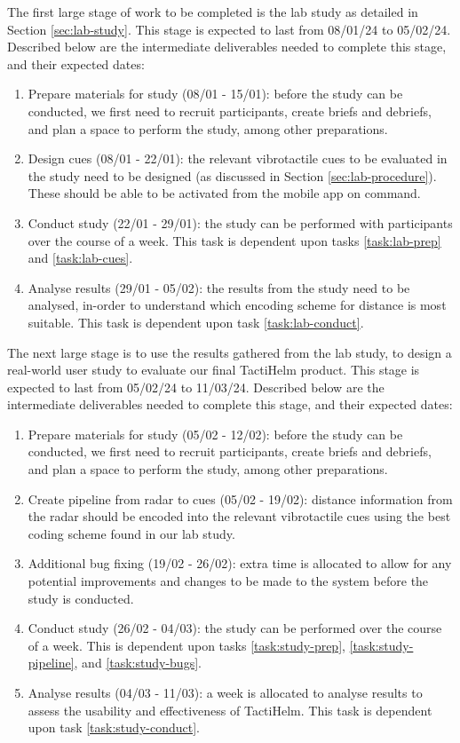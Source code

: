 \documentclass{interim}
\begin{document}
The first large stage of work to be completed is the lab study as detailed in Section \ref{sec:lab-study}. This stage is expected to last from 08/01/24 to 05/02/24. Described below are the intermediate deliverables needed to complete this stage, and their expected dates: 
\begin{enumerate}[label=1.\arabic*]
    \item Prepare materials for study (08/01 - 15/01): before the study can be conducted, we first need to recruit participants, create briefs and debriefs, and plan a space to perform the study, among other preparations.\label{task:lab-prep}
    \item Design cues (08/01 - 22/01): the relevant vibrotactile cues to be evaluated in the study need to be designed (as discussed in Section \ref{sec:lab-procedure}). These should be able to be activated from the mobile app on command. \label{task:lab-cues}
    \item Conduct study (22/01 - 29/01): the study can be performed with participants over the course of a week. This task is dependent upon tasks \ref{task:lab-prep} and \ref{task:lab-cues}. \label{task:lab-conduct}
    \item Analyse results (29/01 - 05/02): the results from the study need to be analysed, in-order to understand which encoding scheme for distance is most suitable. This task is dependent upon task \ref{task:lab-conduct}.
\end{enumerate}

The next large stage is to use the results gathered from the lab study, to design a real-world user study to evaluate our final TactiHelm product. This stage is expected to last from 05/02/24 to 11/03/24. Described below are the intermediate deliverables needed to complete this stage, and their expected dates: 
\begin{enumerate}[label=2.\arabic*]
    \item Prepare materials for study (05/02 - 12/02): before the study can be conducted, we first need to recruit participants, create briefs and debriefs, and plan a space to perform the study, among other preparations.\label{task:study-prep}
    \item Create pipeline from radar to cues (05/02 - 19/02): distance information from the radar should be encoded into the relevant vibrotactile cues using the best coding scheme found in our lab study.\label{task:study-pipeline}
    \item Additional bug fixing (19/02 - 26/02): extra time is allocated to allow for any potential improvements and changes to be made to the system before the study is conducted.\label{task:study-bugs}
    \item Conduct study (26/02 - 04/03): the study can be performed over the course of a week. This is dependent upon tasks \ref{task:study-prep}, \ref{task:study-pipeline}, and \ref{task:study-bugs}. \label{task:study-conduct}
    \item Analyse results (04/03 - 11/03): a week is allocated to analyse results to assess the usability and effectiveness of TactiHelm. This task is dependent upon task \ref{task:study-conduct}.
\end{enumerate}
\end{document}
